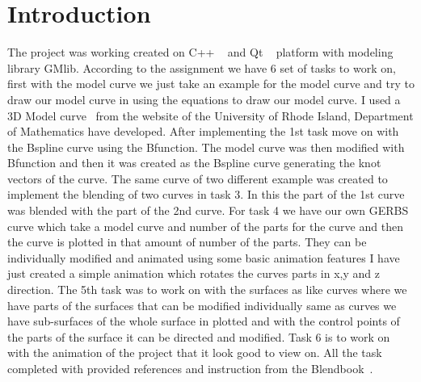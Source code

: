 \documentclass[a4,10pt]{article}
\begin{document}
\section{Introduction}
The project was working created on C++ ~\cite{wesley:2013} and Qt ~\cite{guide:2016} platform with modeling library GMlib.
According to the assignment we have 6 set of tasks to work on, first with the model curve we just take an example for the model curve and try to draw our model curve in using the equations to draw our model curve. I used a 3D Model curve~\cite{ModelCurve} from the website of the University of Rhode Island, Department of Mathematics have developed. After implementing the 1st task move on with the Bspline curve using the Bfunction. The model curve was then modified with Bfunction and then it was created as the Bspline curve generating the knot vectors of the curve.
The same curve of two different example was created to implement the blending of two curves in task 3. In this the part of the 1st curve was blended with the part of the 2nd curve.
For task 4 we have our own GERBS curve which take a model curve and number of the parts for the curve and then the curve is plotted in that amount of number of the parts. They can be individually modified and animated using some basic animation features I have just created a simple animation which rotates the curves parts in x,y and z direction.
The 5th task was to work on with the surfaces as like curves where we have parts of the surfaces that can be modified individually same as curves we have sub-surfaces of the whole surface in plotted and with the control points of the parts of the surface it can be directed and modified.
Task 6 is to work on with the animation of the project that it look good to view on.
All the task completed with provided references and instruction from the Blendbook~\cite{BlendBook:2012}.
\end{document}
